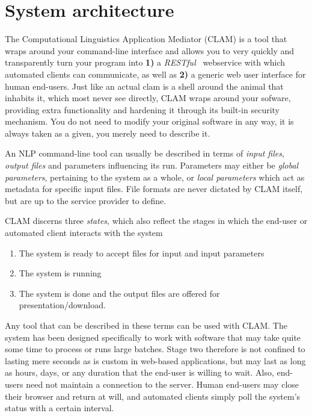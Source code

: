 \documentclass[11pt]{article}
\begin{document}
\section{System architecture}

The Computational Linguistics Application Mediator (CLAM) is a tool that wraps
around your command-line interface and allows you to very quickly and
transparently turn your program into \textbf{1)} a \emph{RESTful}~\cite{REST} webservice with which
automated clients can communicate, as well as \textbf{2)} a generic web user interface
for human end-users. Just like an actual clam is a
shell around the animal that inhabits it, which most never see
directly, CLAM wraps around your sofware, providing extra functionality and
hardening it through its built-in security mechanism. You do not need to modify
your original software in any way, it is always taken as a given, you merely
need to describe it. 

An NLP command-line tool can usually be described in terms of \emph{input
files}, \emph{output files} and parameters influencing its run. Parameters may
either be \emph{global parameters}, pertaining to the system as a whole, or
\emph{local parameters} which act as metadata for specific input files. File
formats are never dictated by CLAM itself, but are up to the service provider
to define.

CLAM discerns three \emph{states}, which also reflect the stages in which
the end-user or automated client interacts with the system

\begin{enumerate}
  \item The system is ready to accept files for input and input parameters
  \item The system is running
  \item The system is done and the output files are offered for
    presentation/download.
\end{enumerate}

Any tool that can be described in these terms can be used with CLAM. The system
has been designed specifically to work with software that may take quite some
time to process or runs large batches. Stage two therefore is not confined to
lasting mere seconds as is custom in web-based applications, but may last as
long as hours, days, or any duration that the end-user is willing to wait.
Also, end-users need not maintain a connection to the server. Human end-users
may close their browser and return at will, and automated clients simply poll the
system's status with a certain interval.
\end{document}

